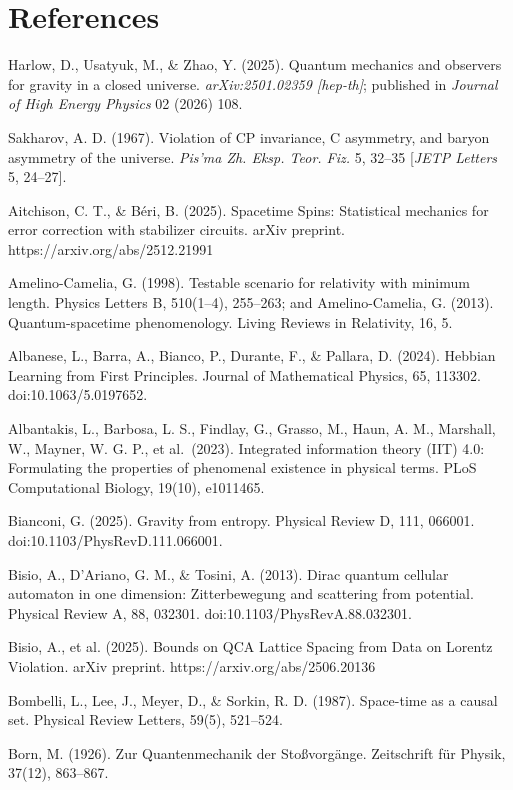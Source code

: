 \documentclass[11pt,oneside]{report}
\theoremstyle{definition}
\theoremstyle{remark}
\newenvironment{reflist}
  {\par\small\setlength{\parindent}{0pt}%
   \setlength{\leftskip}{1.6em}\setlength{\parindent}{-1.6em}%
   \setlength{\parskip}{0.4em}%
   \raggedright\hyphenpenalty=50\exhyphenpenalty=50\relax
   \sloppy}
  {\par}
\begin{document}
\section*{References}
\begin{reflist}
Harlow, D., Usatyuk, M., \& Zhao, Y. (2025). Quantum mechanics and
observers for gravity in a closed universe. \emph{arXiv:2501.02359
[hep-th]}; published in \emph{Journal of High Energy Physics} 02
(2026) 108.

Sakharov, A. D. (1967). Violation of CP invariance, C asymmetry, and
baryon asymmetry of the universe. \emph{Pis'ma Zh. Eksp. Teor. Fiz.} 5,
32--35 [\emph{JETP Letters} 5, 24--27].

Aitchison, C. T., \& Béri, B. (2025). Spacetime Spins: Statistical
mechanics for error correction with stabilizer circuits. arXiv preprint.
https://arxiv.org/abs/2512.21991

Amelino-Camelia, G. (1998). Testable scenario for relativity with
minimum length. Physics Letters B, 510(1--4), 255--263; and
Amelino-Camelia, G. (2013). Quantum-spacetime phenomenology. Living
Reviews in Relativity, 16, 5.

Albanese, L., Barra, A., Bianco, P., Durante, F., \& Pallara, D. (2024).
Hebbian Learning from First Principles. Journal of Mathematical Physics,
65, 113302. doi:10.1063/5.0197652.

Albantakis, L., Barbosa, L. S., Findlay, G., Grasso, M., Haun, A. M.,
Marshall, W., Mayner, W. G. P., et al.~(2023). Integrated information
theory (IIT) 4.0: Formulating the properties of phenomenal existence in
physical terms. PLoS Computational Biology, 19(10), e1011465.

Bianconi, G. (2025). Gravity from entropy. Physical Review D, 111,
066001. doi:10.1103/PhysRevD.111.066001.

Bisio, A., D'Ariano, G. M., \& Tosini, A. (2013). Dirac quantum cellular
automaton in one dimension: Zitterbewegung and scattering from
potential. Physical Review A, 88, 032301. doi:10.1103/PhysRevA.88.032301.

Bisio, A., et al. (2025). Bounds on QCA Lattice Spacing from Data on
Lorentz Violation. arXiv preprint. https://arxiv.org/abs/2506.20136

Bombelli, L., Lee, J., Meyer, D., \& Sorkin, R. D. (1987). Space-time as
a causal set. Physical Review Letters, 59(5), 521--524.

Born, M. (1926). Zur Quantenmechanik der Stoßvorgänge. Zeitschrift für
Physik, 37(12), 863--867.


\end{reflist}
\end{document}
